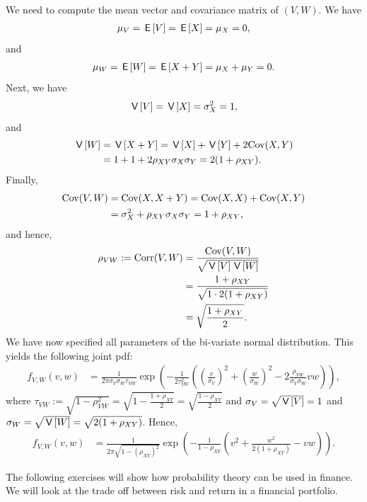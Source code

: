 \documentclass[lectures]{subfiles}
\begin{document}
\begin{exercise}
\begin{solution}
We need to compute the mean vector and covariance matrix of $(V,W)$. We have
\begin{align}
    \mu_V = \,\mathsf{E}\left[V\right] = \,\mathsf{E}\left[X\right] = \mu_X = 0,
\end{align}
and
\begin{align}
    \mu_W = \,\mathsf{E}\left[W\right] = \,\mathsf{E}\left[X + Y\right] = \mu_X + \mu_Y = 0.
\end{align}
Next, we have
\begin{align}
    \,\mathsf{V}\left[V\right] = \,\mathsf{V}\left[X\right] = \sigma_X^2 = 1,
\end{align}
and
\begin{align}
    \,\mathsf{V}\left[W\right] &= \,\mathsf{V}\left[X + Y\right] = \,\mathsf{V}\left[X\right] + \,\mathsf{V}\left[Y\right] + 2\text{Cov}(X,Y)\\
    &= 1 + 1 + 2 \rho_{XY} \sigma_X \sigma_Y = 2(1 + \rho_{XY}).
\end{align}
Finally,
\begin{align}
    \text{Cov}(V,W) &= \text{Cov}(X, X + Y) = \text{Cov}(X, X) + \text{Cov}(X, Y) \\
    &= \sigma_X^2 + \rho_{XY} \sigma_X \sigma_Y = 1 + \rho_{XY},
\end{align}
and hence,
\begin{align}
    \rho_{VW} := \text{Corr}(V,W) &= \frac{\text{Cov}(V,W)}{\sqrt{\,\mathsf{V}\left[V\right]\,\mathsf{V}\left[W\right]}} \\
    &= \frac{1 + \rho_{XY}}{\sqrt{1 \cdot 2(1 + \rho_{XY})}} \\
    &= \sqrt{\frac{1 + \rho_{XY}}{2}}.
\end{align}
We have now specified all parameters of the bi-variate normal distribution. This yields the following joint pdf:
\begin{align}
    f_{V,W}(v,w) &= \frac{1}{2\pi \sigma_V \sigma_W \tau_{VW}} \exp\left(-\frac{1}{2 \tau_{VW}^2}\left(\left(\frac{v}{\sigma_V}\right)^2 + \left(\frac{w}{\sigma_W}\right)^2 - 2 \frac{\rho_{VW}}{\sigma_V \sigma_W} vw\right) \right),
\end{align}
where $\tau_{VW} := \sqrt{1 - \rho_{VW}^2} = \sqrt{1 - \frac{1 + \rho_{XY}}{2}} = \sqrt{\frac{1 - \rho_{XY}}{2}}$ and $\sigma_V = \sqrt{\,\mathsf{V}\left[V\right]} = 1$ and $\sigma_W = \sqrt{\,\mathsf{V}\left[W\right]} = \sqrt{2(1 + \rho_{XY})}$. Hence,
\begin{align}
    f_{V,W}(v,w) &= \frac{1}{2\pi \sqrt{1 - (\rho_{XY})^2}} \exp\left(-\frac{1}{1 - \rho_{XY}}\left(v^2 + \frac{w^2}{2(1 + \rho_{XY})}-vw\right)\right).
\end{align}

\end{solution}
\end{exercise}


The following exercises will show how probability theory can be used in finance. We will look at the trade off between risk and return in a financial portfolio.
\end{document}
